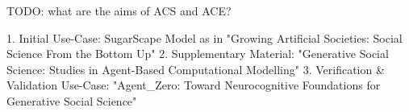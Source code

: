TODO: what are the aims of ACS and ACE?

1. Initial Use-Case: SugarScape Model as in "Growing Artificial Societies: Social Science From the Bottom Up"
2. Supplementary Material: "Generative Social Science: Studies in Agent-Based Computational Modelling"
3. Verification \& Validation Use-Case: "Agent\_Zero: Toward Neurocognitive Foundations for Generative Social Science"

